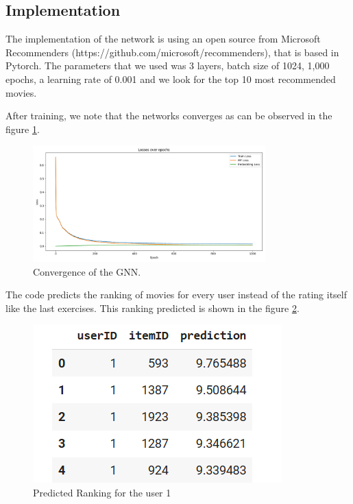 \documentclass[12pt]{article}
\numberwithin{equation}{section}
\begin{document}
\subsection{Implementation}

The implementation of the network is using an open source from Microsoft Recommenders (https://github.com/microsoft/recommenders), that is based in Pytorch. The parameters that we used was 3 layers, batch size of 1024, 1,000 epochs, a learning rate of 0.001 and we look for the top 10 most recommended movies. 

After training, we note that the networks converges as can be observed in the figure \ref{fig:losses_over_epochs}. 

\begin{figure}[h]
	\centering
	\includegraphics[width=0.8\textwidth]{losses_over_epochs.png}
	\caption{Convergence of the GNN.}
	\label{fig:losses_over_epochs}
\end{figure}

The code predicts the ranking of movies for every user instead of the rating itself like the last exercises. This ranking predicted is shown in the figure \ref{fig:predictions}. 

\begin{figure}[h]
		\centering
	\includegraphics{predictions.png}
	\caption{Predicted Ranking for the user 1}
	\label{fig:predictions}
\end{figure}
\end{document}

